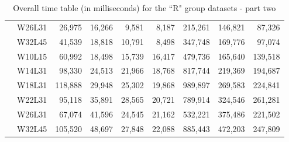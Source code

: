 \begin{table}[!ht]
\begin{tabular}{c r | rrrr | rrr}
		& W26L31 & 26,975 & 16,266 & 9,581 & 8,187 & 215,261 & 146,821 & 87,326 \\
		& W32L45 & 41,539 & 18,818 & 10,791 & 8,498 & 347,748 & 169,776 & 97,074 \\
		\midrule
		\multirow{6}{*}{\rotatebox[origin=c]{90}{\textbf{R5000}}}
		& W10L15 & 60,992 & 18,498 & 15,739 & 16,417 & 479,736 & 165,640 & 139,518 \\
		& W14L31 & 98,330 & 24,513 & 21,966 & 18,768 & 817,744 & 219,369 & 194,687 \\
		& W18L31 & 118,888 & 29,948 & 25,302 & 19,868 & 989,897 & 269,583 & 224,841 \\
		& W22L31 & 95,118 & 35,891 & 28,565 & 20,721 & 789,914 & 324,546 & 261,281 \\
		& W26L31 & 67,074 & 41,596 & 24,545 & 21,162 & 532,221 & 375,486 & 221,502 \\
		& W32L45 & 105,520 & 48,697 & 27,848 & 22,088 & 885,443 & 472,203 & 247,809 \\
		\bottomrule
	\end{tabular}
	\caption{Overall time table (in milliseconds) for the “R" group datasets - part two}
	\label{tab:time-gruppoR-pt2}
\end{table}
\clearpage

